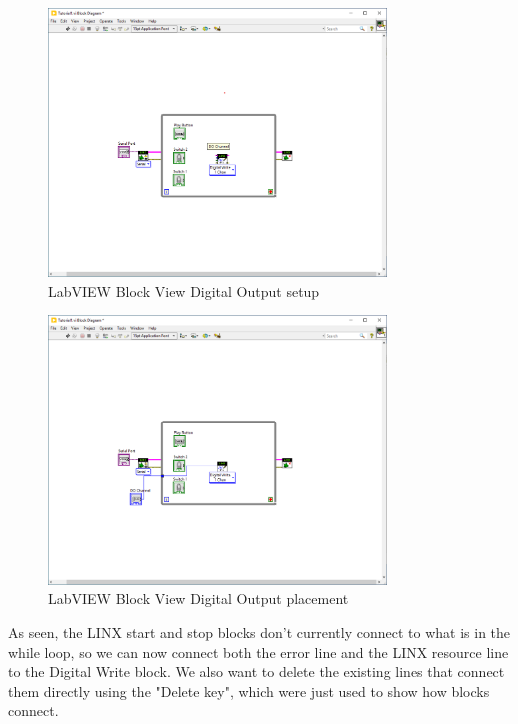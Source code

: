 \documentclass[a4paper,11pt]{report}
\begin{document}
\begin{figure}[H]
\centering
\includegraphics[width=0.8\textwidth]{screenshots/labview20}
\caption{LabVIEW Block View Digital Output setup}
\end{figure}

\begin{figure}[H]
\centering
\includegraphics[width=0.8\textwidth]{screenshots/labview21}
\caption{LabVIEW Block View Digital Output placement}
\end{figure}

As seen, the LINX start and stop blocks don't currently connect to what is in the while loop, so we can now connect both the error line and the LINX resource line to the Digital Write block. We also want to delete the existing lines that connect them directly using the "Delete key", which were just used to show how blocks connect.
\end{document}

